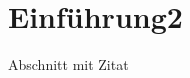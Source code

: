 \documentclass[11pt,a4paper]{report}
\begin{document}




\tableofcontents

\newpage


\section{Einführung2}\label{einfuxfchrung2}

Abschnitt mit Zitat \cite{WebComponentsC24:online}

\newpage












\end{document}
